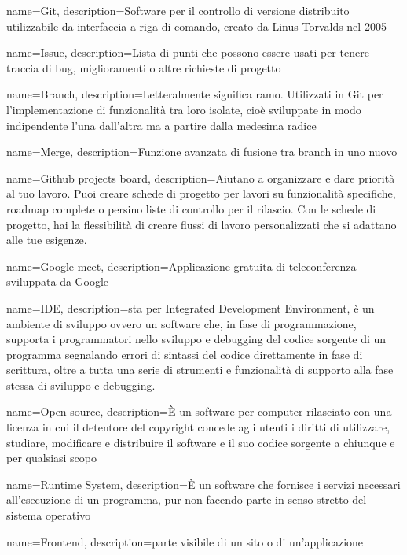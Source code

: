 {
	name={Git},
	description={Software per il controllo di versione distribuito utilizzabile da interfaccia a riga di comando, creato da Linus Torvalds nel 2005}
}

{
	name={Issue},
	description={Lista di punti che possono essere usati per tenere traccia di bug, miglioramenti o altre richieste di progetto}
}

{
	name={Branch},
	description={Letteralmente significa ramo. Utilizzati in Git per l'implementazione di funzionalità tra loro isolate, cioè sviluppate in modo indipendente l'una dall'altra ma a partire dalla medesima radice}
}

{
	name={Merge},
	description={Funzione avanzata di fusione tra branch in uno nuovo}
}

{
	name={Github projects board},
	description={Aiutano a organizzare e dare priorità al tuo lavoro. Puoi creare schede di progetto per lavori su funzionalità specifiche, roadmap complete o persino liste di controllo per il rilascio. Con le schede di progetto, hai la flessibilità di creare flussi di lavoro personalizzati che si adattano alle tue esigenze.}
}

{
	name={Google meet},
	description={Applicazione gratuita di teleconferenza sviluppata da Google}
}

{
	name={IDE},
	description={sta per Integrated Development Environment, è un ambiente di sviluppo ovvero un software che, in fase di programmazione, supporta i programmatori nello sviluppo e debugging del codice sorgente di un programma segnalando errori di sintassi del codice direttamente in fase di scrittura, oltre a tutta una serie di strumenti e funzionalità di supporto alla fase stessa di sviluppo e debugging.}
}

{
	name={Open source},
	description={È un software per computer rilasciato con una licenza in cui il detentore del copyright concede agli utenti i diritti di utilizzare, studiare, modificare e distribuire il software e il suo codice sorgente a chiunque e per qualsiasi scopo}
}

{
	name={Runtime System},
	description={È un software che fornisce i servizi necessari all'esecuzione di un programma, pur non facendo parte in senso stretto del sistema operativo}
}

{
	name={Frontend},
	description={parte visibile di un sito o di un’applicazione}
}

